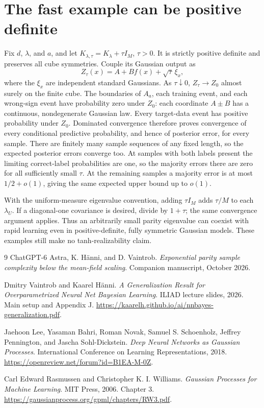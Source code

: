 \documentclass[11pt]{article}
\theoremstyle{remark}\newtheorem{remark}[theorem]{Remark}
\begin{document}
\appendix
\section{The fast example can be positive definite}\label{app:positive}
Fix $d$, $\lambda$, and $a$, and let $K_{\lambda,\tau}=K_\lambda+\tau I_M$, $\tau>0$. It is strictly positive definite and preserves all cube symmetries. Couple its Gaussian output as
\[
 Z_\tau(x)=A+Bf(x)+\sqrt\tau\,\xi_x,
\]
where the $\xi_x$ are independent standard Gaussians. As $\tau\downarrow0$, $Z_\tau\to Z_0$ almost surely on the finite cube. The boundaries of $A_a$, each training event, and each wrong-sign event have probability zero under $Z_0$: each coordinate $A\pm B$ has a continuous, nondegenerate Gaussian law. Every target-data event has positive probability under $Z_0$. Dominated convergence therefore proves convergence of every conditional predictive probability, and hence of posterior error, for every sample. There are finitely many sample sequences of any fixed length, so the expected posterior errors converge too. At samples with both labels present the limiting correct-label probabilities are one, so the majority errors there are zero for all sufficiently small $\tau$. At the remaining samples a majority error is at most $1/2+o(1)$, giving the same expected upper bound up to $o(1)$.

With the uniform-measure eigenvalue convention, adding $\tau I_M$ adds $\tau/M$ to each $\lambda_U$. If a diagonal-one covariance is desired, divide by $1+\tau$; the same convergence argument applies. Thus an arbitrarily small parity eigenvalue can coexist with rapid learning even in positive-definite, fully symmetric Gaussian models. These examples still make no tanh-realizability claim.

\begin{thebibliography}{9}
ChatGPT-6 Astra, K. H\"anni, and D. Vaintrob.
\emph{Exponential parity sample complexity below the mean-field scaling}.
Companion manuscript, October 2026.

Dmitry Vaintrob and Kaarel H\"anni.
\emph{A Generalization Result for Overparametrized Neural Net Bayesian Learning}.
ILIAD lecture slides, 2026. Main setup and Appendix J.
\url{https://kaarelh.github.io/ai/nnbayes-generalization.pdf}.

Jaehoon Lee, Yasaman Bahri, Roman Novak, Samuel S. Schoenholz, Jeffrey Pennington, and Jascha Sohl-Dickstein.
\emph{Deep Neural Networks as Gaussian Processes}.
International Conference on Learning Representations, 2018.
\url{https://openreview.net/forum?id=B1EA-M-0Z}.

Carl Edward Rasmussen and Christopher K. I. Williams.
\emph{Gaussian Processes for Machine Learning}.
MIT Press, 2006. Chapter 3.
\url{https://gaussianprocess.org/gpml/chapters/RW3.pdf}.
\end{thebibliography}
\end{document}
